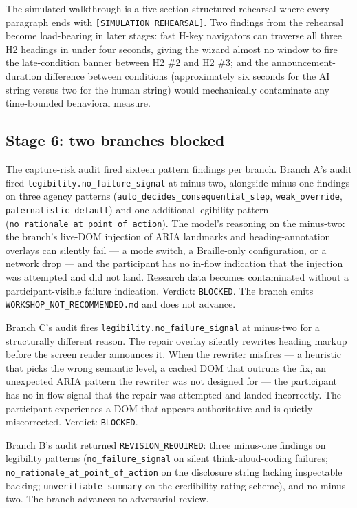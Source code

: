 The simulated walkthrough is a five-section structured rehearsal where every paragraph ends with \texttt{[SIMULATION\_REHEARSAL]}. Two findings from the rehearsal become load-bearing in later stages: fast H-key navigators can traverse all three H2 headings in under four seconds, giving the wizard almost no window to fire the late-condition banner between H2 \#2 and H2 \#3; and the announcement-duration difference between conditions (approximately six seconds for the AI string versus two for the human string) would mechanically contaminate any time-bounded behavioral measure.

\subsection{Stage 6: two branches blocked}

The capture-risk audit fired sixteen pattern findings per branch. Branch A's audit fired \texttt{legibility.no\_failure\_signal} at minus-two, alongside minus-one findings on three agency patterns (\texttt{auto\_decides\_consequential\_step}, \texttt{weak\_override}, \texttt{paternalistic\_default}) and one additional legibility pattern (\texttt{no\_rationale\_at\_point\_of\_action}). The model's reasoning on the minus-two: the branch's live-DOM injection of ARIA landmarks and heading-annotation overlays can silently fail — a mode switch, a Braille-only configuration, or a network drop — and the participant has no in-flow indication that the injection was attempted and did not land. Research data becomes contaminated without a participant-visible failure indication. Verdict: \texttt{BLOCKED}. The branch emits \texttt{WORKSHOP\_NOT\_RECOMMENDED.md} and does not advance.

Branch C's audit fires \texttt{legibility.no\_failure\_signal} at minus-two for a structurally different reason. The repair overlay silently rewrites heading markup before the screen reader announces it. When the rewriter misfires --- a heuristic that picks the wrong semantic level, a cached DOM that outruns the fix, an unexpected ARIA pattern the rewriter was not designed for --- the participant has no in-flow signal that the repair was attempted and landed incorrectly. The participant experiences a DOM that appears authoritative and is quietly miscorrected. Verdict: \texttt{BLOCKED}.

Branch B's audit returned \texttt{REVISION\_REQUIRED}: three minus-one findings on legibility patterns (\texttt{no\_failure\_signal} on silent think-aloud-coding failures; \texttt{no\_rationale\_at\_point\_of\_action} on the disclosure string lacking inspectable backing; \texttt{unverifiable\_summary} on the credibility rating scheme), and no minus-two. The branch advances to adversarial review.

